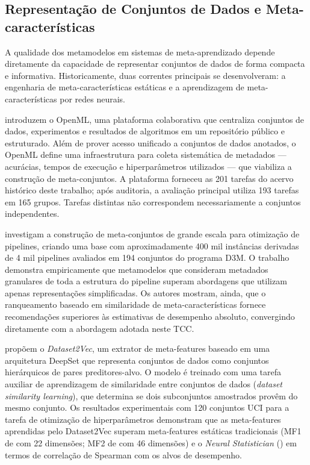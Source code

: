 \subsection{Representação de Conjuntos de Dados e Meta-características}
\label{sec:relMetaFeatures}

A qualidade dos metamodelos em sistemas de meta-aprendizado depende diretamente da capacidade de representar conjuntos de dados de forma compacta e informativa. Historicamente, duas correntes principais se desenvolveram: a engenharia de meta-características estáticas e a aprendizagem de meta-características por redes neurais.

 introduzem o OpenML, uma plataforma colaborativa que centraliza conjuntos de dados, experimentos e resultados de algoritmos em um repositório público e estruturado. Além de prover acesso unificado a conjuntos de dados anotados, o OpenML define uma infraestrutura para coleta sistemática de metadados — acurácias, tempos de execução e hiperparâmetros utilizados — que viabiliza a construção de meta-conjuntos. A plataforma forneceu as 201 tarefas do acervo histórico deste trabalho; após auditoria, a avaliação principal utiliza 193 tarefas em 165 grupos. Tarefas distintas não correspondem necessariamente a conjuntos independentes.

 investigam a construção de meta-conjuntos de grande escala para otimização de pipelines, criando uma base com aproximadamente 400 mil instâncias derivadas de 4 mil pipelines avaliados em 194 conjuntos do programa D3M. O trabalho demonstra empiricamente que metamodelos que consideram metadados granulares de toda a estrutura do pipeline superam abordagens que utilizam apenas representações simplificadas. Os autores mostram, ainda, que o ranqueamento baseado em similaridade de meta-características fornece recomendações superiores às estimativas de desempenho absoluto, convergindo diretamente com a abordagem adotada neste TCC.

 propõem o \textit{Dataset2Vec}, um extrator de meta-features baseado em uma arquitetura DeepSet que representa conjuntos de dados como conjuntos hierárquicos de pares preditores-alvo. O modelo é treinado com uma tarefa auxiliar de aprendizagem de similaridade entre conjuntos de dados (\textit{dataset similarity learning}), que determina se dois subconjuntos amostrados provêm do mesmo conjunto. Os resultados experimentais com 120 conjuntos UCI para a tarefa de otimização de hiperparâmetros demonstram que as meta-features aprendidas pelo Dataset2Vec superam meta-features estáticas tradicionais (MF1 de  com 22 dimensões; MF2 de  com 46 dimensões) e o \textit{Neural Statistician} () em termos de correlação de Spearman com os alvos de desempenho.

